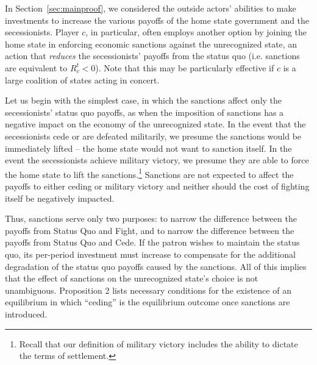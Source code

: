 \documentclass[11pt,letterpaper, notitlepage]{article}
\begin{document}

In Section~\ref{sec:mainproof}, we considered the outside actors' abilities to make investments to increase the various payoffs of the home state government and the secessionists. Player $c$, in particular, often employs another option by joining the home state in enforcing economic sanctions against the unrecognized state, an action that \emph{reduces} the secessionists' payoffs from the status quo (i.e. sanctions are equivalent to $R_c^t < 0$). Note that this may be particularly effective if $c$ is a large coalition of states acting in concert. 

Let us begin with the simplest case, in which the sanctions affect only the secessionists' status quo payoffs, as when the imposition of sanctions has a negative impact on the economy of the unrecognized state. In the event that the secessionists cede or are defeated militarily, we presume the sanctions would be immediately lifted -- the home state would not want to sanction itself. In the event the secessionists achieve military victory, we presume they are able to force the home state to lift the sanctions.\footnote{Recall that our definition of military victory includes the ability to dictate the terms of settlement.} Sanctions are not expected to affect the payoffs to either ceding or military victory and neither should the cost of fighting itself be negatively impacted.

Thus, sanctions serve only two purposes: to narrow the difference between the payoffs from Status Quo and Fight, and to narrow the difference between the payoffs from Status Quo and Cede. If the patron wishes to maintain the status quo, its per-period investment must increase to compensate for the additional degradation of the status quo payoffs caused by the sanctions. All of this implies that the effect of sanctions on the unrecognized state's choice is not unambiguous. Proposition 2 lists necessary conditions for the existence of an equilibrium in which ``ceding'' is the equilibrium outcome once sanctions are introduced.
\end{document}
